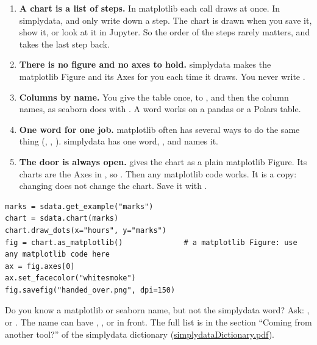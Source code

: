 \begin{enumerate}
  \item \textbf{A chart is a list of steps.} In matplotlib each call draws at once. In simplydata,
     and  only write down a step. The chart is
    drawn when you save it, show it, or look at it in Jupyter. So the order of the steps rarely
    matters, and  takes the last step back.
  \item \textbf{There is no figure and no axes to hold.} simplydata makes the matplotlib Figure and
    its Axes for you each time it draws. You never write .
  \item \textbf{Columns by name.} You give the table once, to , and then the
    column names, as seaborn does with . A word works on a pandas or a Polars table.
  \item \textbf{One word for one job.} matplotlib often has several ways to do the same thing
    (, , ). simplydata has one word,
    , and  names it.
  \item \textbf{The door is always open.}  gives the chart as a
    plain matplotlib Figure. Its charts are the Axes in , so .
    Then any matplotlib code works. It is a copy: changing  does not change the chart.
    Save it with .
\end{enumerate}

\begin{lstlisting}[style=py]
marks = sdata.get_example("marks")
chart = sdata.chart(marks)
chart.draw_dots(x="hours", y="marks")
fig = chart.as_matplotlib()              # a matplotlib Figure: use any matplotlib code here
ax = fig.axes[0]
ax.set_facecolor("whitesmoke")
fig.savefig("handed_over.png", dpi=150)
\end{lstlisting}

Do you know a matplotlib or seaborn name, but not the simplydata word? Ask:
,  or
. The name can have , ,  or
 in front. The full list is in the section ``Coming from another tool?'' of the simplydata
dictionary
(\href{https://github.com/bioforkgithub/simplydata/blob/main/docs/manual/simplydataDictionary.pdf}%
{simplydataDictionary.pdf}).

